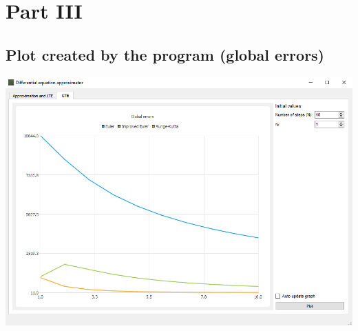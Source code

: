 \documentclass{article}
\begin{document}
\section{Part III}
\subsection{Plot created by the program (global errors)}
\includegraphics[scale=0.5]{DiffEqGte.png}
\end{document}
